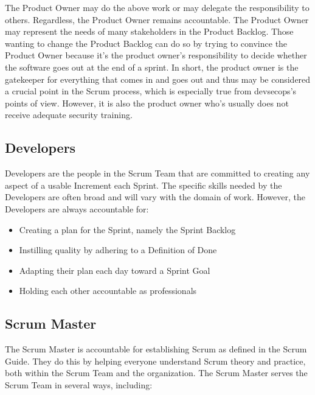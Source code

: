 \begin{flushleft}
	The Product Owner may do the above work or may delegate the responsibility to
	others. Regardless, the Product Owner remains accountable. The Product Owner
	may represent the needs of many stakeholders in the Product Backlog. Those
	wanting to change the Product Backlog can do so by trying to convince the
	Product Owner because it's the product owner's responsibility to decide whether
	the software goes out at the end of a sprint. In short, the product owner is
	the gatekeeper for everything that comes in and goes out and thus may be
	considered a crucial point in the Scrum process, which is especially true
	from devsecops's points of view. However, it is also the product owner who's
	usually does not receive adequate security training.
\end{flushleft}

\subsection{Developers}\label{scrum-developers}

\begin{flushleft}
	Developers are the people in the Scrum Team that are committed to creating any
	aspect of a usable Increment each Sprint. The specific skills needed by the
	Developers are often broad and will vary with the domain of work. However, the
	Developers are always accountable for:
\end{flushleft}

\begin{itemize}
	\item Creating a plan for the Sprint, namely the Sprint Backlog
	\item Instilling quality by adhering to a Definition of Done
	\item Adapting their plan each day toward a Sprint Goal
	\item Holding each other accountable as professionals
\end{itemize}

\subsection{Scrum Master}\label{scrum-master}

\begin{flushleft}
	The Scrum Master is accountable for establishing Scrum as defined in the Scrum
	Guide. They do this by helping everyone understand Scrum theory and practice,
	both within the Scrum Team and the organization. The Scrum Master serves the
	Scrum Team in several ways, including:
\end{flushleft}

